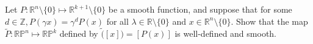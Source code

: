 Let $P:\mathbb{R}^{n}\setminus\{0\}\mapsto\mathbb{R}^{k+1}\setminus\{0\}$ be a smooth function, and suppose that for some $d \in \mathbb{Z}, P(\gamma x) = \gamma^d P(x)$ for all $\lambda \in \mathbb{R}\setminus\{0\}$ and $x \in \mathbb{R}^{n}\setminus\{0\}$.  Show that the map $\tilde{P}:\mathbb{RP}^n \mapsto \mathbb{RP}^k$ defined by $\tilde([x]) = [P(x)]$ is well-defined and smooth.